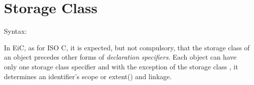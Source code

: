 \section{Storage Class}
\label{sec:StorageClass}
Syntax:
\begin{quote} 
\end{quote}

In EiC, as for ISO C, it is expected, but not compulsory, that the
storage class of an object precedes other forms of {\it declaration
specifiers}. Each object can have only one storage class specifier
and with the exception of the storage class , it
 determines an identifier's scope or
 extent() and linkage.

